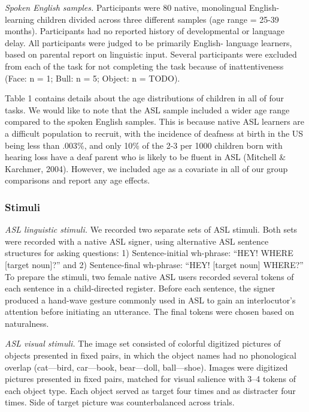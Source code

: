 \documentclass[10pt, letterpaper]{article}
\begin{document}
\emph{Spoken English samples.} Participants were 80 native, monolingual
English-learning children divided across three different samples (age
range = 25-39 months). Participants had no reported history of
developmental or language delay. All participants were judged to be
primarily English- language learners, based on parental report on
linguistic input. Several participants were excluded from each of the
task for not completing the task because of inattentiveness (Face: n =
1; Bull: n = 5; Object: n = TODO).

Table 1 contains details about the age distributions of children in all
of four tasks. We would like to note that the ASL sample included a
wider age range compared to the spoken English samples. This is because
native ASL learners are a difficult population to recruit, with the
incidence of deafness at birth in the US being less than .003\%, and
only 10\% of the 2-3 per 1000 children born with hearing loss have a
deaf parent who is likely to be fluent in ASL (Mitchell \& Karchmer,
2004). However, we included age as a covariate in all of our group
comparisons and report any age effects.

\subsubsection{Stimuli}\label{stimuli}

\emph{ASL linguistic stimuli.} We recorded two separate sets of ASL
stimuli. Both sets were recorded with a native ASL signer, using
alternative ASL sentence structures for asking questions: 1)
Sentence-initial wh-phrase: ``HEY! WHERE {[}target noun{]}?'' and 2)
Sentence-final wh-phrase: ``HEY! {[}target noun{]} WHERE?'' To prepare
the stimuli, two female native ASL users recorded several tokens of each
sentence in a child-directed register. Before each sentence, the signer
produced a hand-wave gesture commonly used in ASL to gain an
interlocutor's attention before initiating an utterance. The final
tokens were chosen based on naturalness.

\emph{ASL visual stimuli.} The image set consisted of colorful digitized
pictures of objects presented in fixed pairs, in which the object names
had no phonological overlap (cat---bird, car---book, bear---doll,
ball---shoe). Images were digitized pictures presented in fixed pairs,
matched for visual salience with 3--4 tokens of each object type. Each
object served as target four times and as distracter four times. Side of
target picture was counterbalanced across trials.
\end{document}
